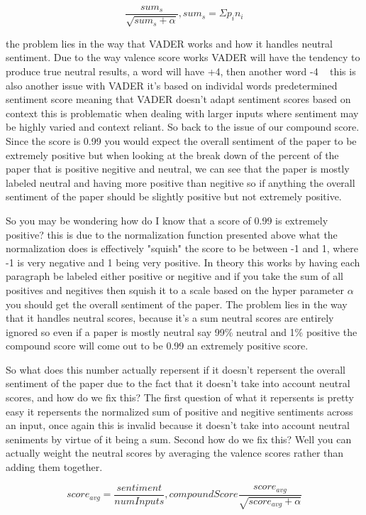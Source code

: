 \documentclass[12pt]{article}
\begin{document}
$$
\frac{sum_s}{\sqrt{sum_s+\alpha}}, sum_s = \Sigma{}p_i n_i
$$

the problem lies in the way that VADER works and how it handles neutral
sentiment. Due to the way valence score works VADER will have the tendency
to produce true neutral results, a word will have +4, then another word -4 ~\cite{vadercode} %
this is also another issue with VADER it's based on individal words predetermined
sentiment score meaning that VADER doesn't adapt sentiment scores based on context
this is problematic when dealing with larger inputs where sentiment may be highly varied
and context reliant. So back to the issue of our compound score.
Since the score is 0.99 you would expect the overall sentiment of the paper to be
extremely positive but when looking at the break down of the percent of the paper
that is positive negitive and neutral, we can see that the paper is mostly
labeled neutral and having more positive than negitive so if anything the overall
sentiment of the paper should be slightly positive but not extremely positive.

So you may be wondering how do I know that a score of 0.99 is extremely positive?
this is due to the normalization function presented above what the normalization
does is effectively "squish" the score to be between -1 and 1, where -1 is very 
negative and 1 being very positive. In theory this works by having each paragraph
be labeled either positive or negitive and if you take the sum of all positives and
negitives then squish it to a scale based on the hyper parameter $\alpha$ you
should get the overall sentiment of the paper. The problem lies in the way that it
handles neutral scores, because it's a sum neutral scores are entirely ignored
so even if a paper is mostly neutral say 99\% neutral and 1\% positive the compound
score will come out to be 0.99 an extremely positive score. 

So what does this number actually repersent
if it doesn't repersent the overall sentiment of the paper due to the fact
that it doesn't take into account
neutral scores, and how do we fix this? The first question of what it repersents
is pretty easy it repersents the normalized sum of positive and negitive sentiments 
across an input, once again this is invalid because it doesn't take into account
neutral seniments by virtue of it being a sum. Second how do we fix this? Well
you can actually weight the neutral scores by averaging the valence scores rather
than adding them together.

$$
score_{avg} = \frac{sentiment}{numInputs}, 
compoundScore\frac{score_{avg}}{\sqrt{score_{avg} + \alpha}}
$$
\end{document}
